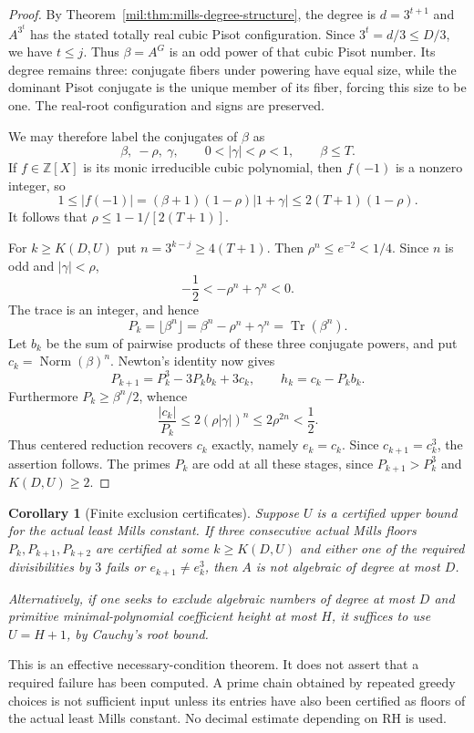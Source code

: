 \documentclass[11pt,a4paper]{article}
\newtheorem{corollary}[theorem]{Corollary}
\theoremstyle{definition}
\theoremstyle{remark}
\numberwithin{equation}{section}
\begin{document}
\begin{proof}
By Theorem~\ref{mil:thm:mills-degree-structure}, the degree is $d=3^{t+1}$
and $A^{3^t}$ has the stated totally real cubic Pisot configuration.
Since $3^t=d/3\leq D/3$, we have $t\leq j$. Thus $\beta=A^G$ is an
odd power of that cubic Pisot number. Its degree remains three:
conjugate fibers under powering have equal size, while the dominant
Pisot conjugate is the unique member of its fiber, forcing this size
to be one. The real-root configuration and signs are preserved.

We may therefore label the conjugates of $\beta$ as
\[
 \beta,\ -\rho,\ \gamma,
 \qquad 0<|\gamma|<\rho<1,\qquad \beta\leq T.
\]
If $f\in\mathbb Z[X]$ is its monic irreducible cubic polynomial, then
$f(-1)$ is a nonzero integer, so
\[
 1\leq|f(-1)|
   =(\beta+1)(1-\rho)|1+\gamma|
   \leq2(T+1)(1-\rho).
\]
It follows that $\rho\leq1-1/[2(T+1)]$.

For $k\geq K(D,U)$ put $n=3^{k-j}\geq4(T+1)$. Then
$\rho^n\leq e^{-2}<1/4$. Since $n$ is odd and $|\gamma|<\rho$,
\[
 -\frac12<-\rho^n+\gamma^n<0.
\]
The trace is an integer, and hence
\[
 P_k=\lfloor\beta^n\rfloor
     =\beta^n-\rho^n+\gamma^n=\operatorname{Tr}(\beta^n).
\]
Let $b_k$ be the sum of pairwise products of these three conjugate
powers, and put $c_k=\operatorname{Norm}(\beta)^n$. Newton's identity
now gives
\[
 P_{k+1}=P_k^3-3P_kb_k+3c_k,
 \qquad h_k=c_k-P_kb_k.
\]
Furthermore $P_k\geq\beta^n/2$, whence
\[
 \frac{|c_k|}{P_k}
 \leq2(\rho|\gamma|)^n
 \leq2\rho^{2n}<\frac12.
\]
Thus centered reduction recovers $c_k$ exactly, namely $e_k=c_k$.
Since $c_{k+1}=c_k^3$, the assertion follows. The primes $P_k$ are odd
at all these stages, since $P_{k+1}>P_k^3$ and $K(D,U)\geq2$.
\end{proof}

\begin{corollary}[Finite exclusion certificates]
Suppose $U$ is a certified upper bound for the actual least Mills
constant. If three consecutive actual Mills floors
$P_k,P_{k+1},P_{k+2}$ are certified at some $k\geq K(D,U)$ and either
one of the required divisibilities by $3$ fails or
$e_{k+1}\ne e_k^3$, then $A$ is not algebraic of degree at most $D$.

Alternatively, if one seeks to exclude algebraic numbers of degree
at most $D$ and primitive minimal-polynomial coefficient height at
most $H$, it suffices to use $U=H+1$, by Cauchy's root bound.
\end{corollary}

This is an effective necessary-condition theorem. It does not assert
that a required failure has been computed. A prime chain obtained by
repeated greedy choices is not sufficient input unless its entries
have also been certified as floors of the actual least Mills
constant. No decimal estimate depending on RH is used.
\end{document}
